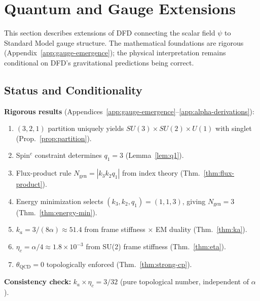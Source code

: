 
\section{Quantum and Gauge Extensions}\label{sec:quantum}

This section describes extensions of DFD connecting the scalar field $\psi$ to Standard Model gauge structure. The mathematical foundations are rigorous (Appendix~\ref{app:gauge-emergence}); the physical interpretation remains conditional on DFD's gravitational predictions being correct.

\subsection{Status and Conditionality}\label{sec:quantum-status}

\begin{tcolorbox}[colback=blue!5!white, colframe=blue!60!black, title=Mathematical Status, boxsep=2pt, left=2pt, right=2pt]
\small
\textbf{Rigorous results} (Appendices~\ref{app:gauge-emergence}--\ref{app:alpha-derivations}):
\begin{enumerate}[nosep, leftmargin=*]
\item $(3,2,1)$ partition uniquely yields $SU(3) \times SU(2) \times U(1)$ with singlet (Prop.~\ref{prop:partition}).
\item Spin$^c$ constraint determines $q_1 = 3$ (Lemma~\ref{lem:q1}).
\item Flux-product rule $N_{\text{gen}} = |k_3 k_2 q_1|$ from index theory (Thm.~\ref{thm:flux-product}).
\item Energy minimization selects $(k_3, k_2, q_1) = (1,1,3)$, giving $N_{\text{gen}} = 3$ (Thm.~\ref{thm:energy-min}).
\item $k_a = 3/(8\alpha) \approx 51.4$ from frame stiffness $\times$ EM duality (Thm.~\ref{thm:ka}).
\item $\eta_c = \alpha/4 \approx 1.8 \times 10^{-3}$ from SU(2) frame stiffness (Thm.~\ref{thm:eta}).
\item $\theta_{\text{QCD}} = 0$ topologically enforced (Thm.~\ref{thm:strong-cp}).
\end{enumerate}
\end{tcolorbox}
\textbf{Consistency check:} $k_a \times \eta_c = 3/32$ (pure topological number, independent of $\alpha$).

